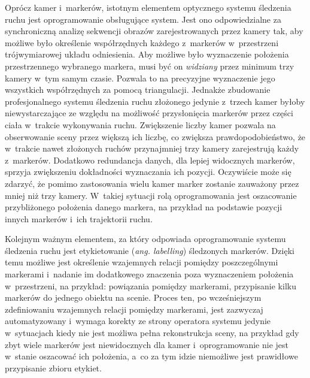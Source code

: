 Oprócz kamer i~markerów, istotnym elementem optycznego systemu śledzenia ruchu jest oprogramowanie obsługujące system. Jest ono odpowiedzialne za synchroniczną analizę sekwencji obrazów zarejestrowanych przez kamery tak, aby możliwe było określenie współrzędnych każdego z~markerów w~przestrzeni trójwymiarowej układu odniesienia. Aby możliwe było wyznaczenie położenia przestrzennego wybranego markera, musi być on \textsl{widziany} przez minimum trzy kamery w~tym samym czasie. Pozwala to na precyzyjne wyznaczenie jego wszystkich współrzędnych za pomocą triangulacji. Jednakże zbudowanie profesjonalnego systemu śledzenia ruchu złożonego jedynie z~trzech kamer byłoby niewystarczające ze względu na możliwość przysłonięcia markerów przez części ciała w~trakcie wykonywania ruchu. Zwiększenie liczby kamer pozwala na obserwowanie sceny przez większą ich liczbę, co zwiększa prawdopodobieństwo, że w~trakcie nawet złożonych ruchów przynajmniej trzy kamery zarejestrują każdy z~markerów. Dodatkowo redundancja danych, dla lepiej widocznych markerów, sprzyja zwiększeniu dokładności wyznaczania ich pozycji. Oczywiście może się zdarzyć, że pomimo zastosowania wielu kamer marker zostanie zauważony przez mniej niż trzy kamery. W~takiej sytuacji rolą oprogramowania jest oszacowanie przybliżonego położenia danego markera, na przykład na podstawie pozycji innych markerów i~ich trajektorii ruchu.
			
Kolejnym ważnym elementem, za który odpowiada oprogramowanie systemu śledzenia ruchu jest etykietowanie (\emph{ang. labelling}) śledzonych markerów. Dzięki temu możliwe jest określenie wzajemnych relacji pomiędzy poszczególnymi markerami i~nadanie im dodatkowego znaczenia poza wyznaczeniem położenia w~przestrzeni, na przykład: powiązania pomiędzy markerami, przypisanie kilku markerów do jednego obiektu na scenie. Proces ten, po wcześniejszym zdefiniowaniu wzajemnych relacji pomiędzy markerami, jest zazwyczaj automatyzowany i~wymaga korekty ze strony operatora systemu jedynie w~sytuacjach kiedy nie jest możliwa pełna rekonstrukcja sceny, na przykład gdy zbyt wiele markerów jest niewidocznych dla kamer i~oprogramowanie nie jest w~stanie oszacować ich położenia, a~co za tym idzie niemożliwe jest prawidłowe przypisanie zbioru etykiet.


